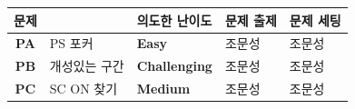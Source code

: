     \begin{frame} %
        \begin{center}
            \begin{tabular}{cl|l|l|l}
                \hline
                문제 & & 의도한 난이도 & 문제 출제 & 문제 세팅 \\
                \hline
                \hline
                \textbf{PA} & PS 포커 & \textbf{\color{acbronze} Easy} & 조문성 & 조문성 \\
                \textbf{PB} & 개성있는 구간 & \textbf{\color{acplatinum} Challenging} & 조문성 & 조문성 \\
                \textbf{PC} & SC ON 찾기 & \textbf{\color{acsilver} Medium} & 조문성 & 조문성 \\
                
                \hline
            \end{tabular}
        \end{center}
    \end{frame}


